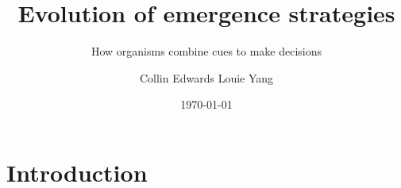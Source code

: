 \documentclass[pdf]{beamer}
\title{Evolution of emergence strategies}
\subtitle{How organisms combine cues to make decisions}
\author{Collin Edwards 
Louie Yang}
\date{\today}
\begin{document}
\begin{frame}
 \maketitle
\end{frame}
\section{Introduction}

\begin{frame}
\frametitle{}
\begin{center}


\end{center}
\end{frame}
\end{document}
